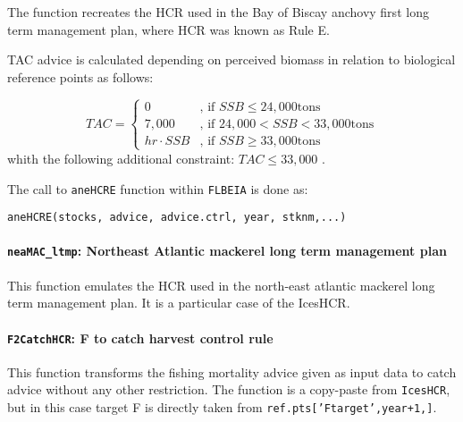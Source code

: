   The function recreates the HCR used in the Bay of Biscay anchovy first long term management plan, where HCR was known as Rule E.
  
  
  TAC advice is calculated depending on perceived biomass in relation to biological reference points as follows:

  \begin{equation}
  	TAC =
  	\begin{cases}
				0             & \text{, if } SSB \leq 24,000 \text{tons} \\
				7,000         & \text{, if } 24,000 < SSB < 33,000 \text{tons}\\
				hr  \cdot SSB & \text{, if } SSB \geq 33,000 \text{tons}
  	\end{cases}
  \end{equation}
  \noindent whith the following additional constraint: $TAC \leq 33,000$ .


  The call to \texttt{aneHCRE} function within \texttt{FLBEIA} is done as:

	\begin{center}
		\texttt{aneHCRE(stocks, advice, advice.ctrl, year, stknm,...)}
	\end{center}


\paragraph{\texttt{neaMAC\_ltmp}: Northeast Atlantic mackerel long term management plan} \hspace{0pt} \smallskip

  This function emulates the HCR used in the north-east atlantic mackerel long term management plan. 
  It is a particular case of the IcesHCR.
  
  
  \paragraph{\texttt{F2CatchHCR}: F to catch harvest control rule} \hspace{0pt} \smallskip

  This function transforms the fishing mortality advice given as input data to catch advice without any other restriction.
  The function is a copy-paste from \texttt{IcesHCR}, but in this case target F is directly taken from \texttt{ref.pts['Ftarget',year+1,]}.
  

